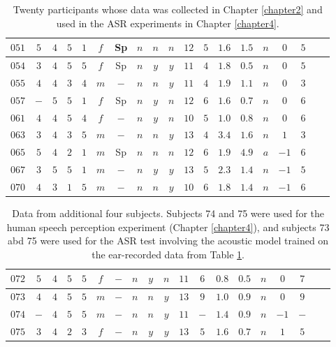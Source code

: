 \begin{table}
\begin{tabular}{|c||c|c|c|c|c|c|c|c|c|c|c|c|c|c|c|c|c|c|}
\textbf{$051$} & $5$ & $4$ & $5$ & $1$ & $f$ & Sp & $n$ & $n$ & $n$ & $12$ & $5$ & $1.6$ & $1.5$ & $n$ & $0$ & $5$ \\ \hline
\textbf{$054$} & $3$ & $4$ & $5$ & $5$ & $f$ & Sp & $n$ & $y$ & $y$ & $11$ & $4$ & $1.8$ & $0.5$ & $n$ & $0$ & $5$ \\ \hline
\textbf{$055$} & $4$ & $4$ & $3$ & $4$ & $m$ & $-$ & $n$ & $n$ & $y$ & $11$ & $4$ & $1.9$ & $1.1$ & $n$ & $0$ & $3$  \\ \hline
\textbf{$057$} & $-$ & $5$ & $5$ & $1$ & $f$ & Sp & $n$ & $y$ & $n$ & $12$ & $6$ & $1.6$ & $0.7$ & $n$ & $0$ & $6$ \\ \hline
\textbf{$061$} & $4$ & $4$ & $5$ & $4$ & $f$ & $-$ & $n$ & $y$ & $n$ & $10$ & $5$ & $1.0$ & $0.8$ & $n$ & $0$ & $6$ \\ \hline
\textbf{$063$} & $3$ & $4$ & $3$ & $5$ & $m$ & $-$ & $n$ & $n$ & $y$ & $13$ & $4$ & $3.4$ & $1.6$ & $n$ & $1$ & $3$  \\ \hline
\textbf{$065$} & $5$ & $4$ & $2$ & $1$ & $m$ & Sp & $n$ & $n$ & $n$ & $12$ & $6$ & $1.9$ & $4.9$ & $a$ & $-1$ & $6$  \\ \hline
\textbf{$067$} & $3$ & $5$ & $5$ & $1$ & $m$ & $-$ & $n$ & $y$ & $y$ & $13$ & $5$ & $2.3$ & $1.4$ & $n$ & $-1$ & $5$ \\ \hline
\textbf{$070$} & $4$ & $3$ & $1$ & $5$ & $m$ & $-$ & $n$ & $n$ & $y$ & $10$ & $6$ & $1.8$ & $1.4$ & $n$ & $-1$ & $6$ \\ \hline
\end{tabular}
\caption{Twenty participants whose data was collected in Chapter \ref{chapter2} and used in the ASR experiments in Chapter \ref{chapter4}.}\label{tab:expt1-data}
\end{table}

\begin{table}
\centering
\begin{tabular}{|c||c|c|c|c|c|c|c|c|c|c|c|c|c|c|c|c|c|c|}\hline
\textbf{$072$} & $5$ & $4$ & $5$ & $5$ & $f$ & $-$ & $n$ & $y$ & $n$ & $11$ & $6$ & $0.8$ & $0.5$ & $n$ & $0$ & $7$ \\ \hline
\textbf{$073$} & $4$ & $4$ & $5$ & $5$ & $m$ & $-$ & $n$ & $n$ & $y$ & $13$ & $9$ & $1.0$ & $0.9$ & $n$ & $0$ & $9$ \\ \hline
\textbf{$074$} & $-$ & $4$ & $5$ & $5$ & $m$ & $-$ & $n$ & $n$ & $y$ & $11$ & $-$ & $1.4$ & $0.9$ & $n$ & $-1$ & $-$  \\ \hline
\textbf{$075$} & $3$ & $4$ & $2$ & $3$ & $f$ & $-$ & $n$ & $y$ & $y$ & $13$ & $5$ & $1.6$ & $0.7$ & $n$ & $1$ & $5$ \\ \hline
\end{tabular}
\caption{Data from additional four subjects.  Subjects 74 and 75 were used for the human speech perception experiment (Chapter \ref{chapter4}), and subjects 73 abd 75 were used for the ASR test involving the acoustic model trained on the ear-recorded data from Table \ref{tab:expt1-data}.}\label{tab:expt2-stims}
\end{table}

